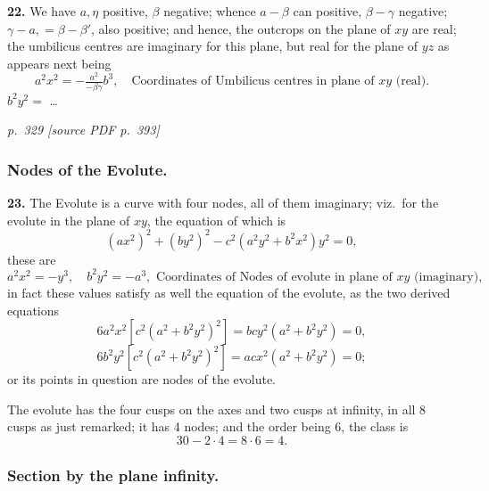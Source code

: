 \documentclass[11pt,a4paper]{article}
\newcommand{\pagemarker}[2]{\par\bigskip\noindent\textit{p.~#1 [source PDF p.~#2]}\par\smallskip}
\begin{document}
\textbf{22.} We have $a, \eta$ positive, $\beta$ negative; whence $a - \beta$ can positive, $\beta - \gamma$ negative; $\gamma - a, = \beta - \beta'$, also positive; and hence, the outcrops on the plane of $xy$ are real; the umbilicus centres are imaginary for this plane, but real for the plane of $yz$ as appears next being
\[
a^2 x^2 = -\tfrac{a^2}{-\beta\gamma}b^3,\quad\text{Coordinates of Umbilicus centres in plane of $xy$ (real).}
\]
$b^2 y^2 = $ \ldots

\clearpage

\pagemarker{329}{393}

\subsubsection*{Nodes of the Evolute.}

\textbf{23.} The Evolute is a curve with four nodes, all of them imaginary; viz.\ for the evolute in the plane of $xy$, the equation of which is
\[
(a x^2)^2 + (b y^2)^2 - c^2(a^2 y^2 + b^2 x^2) y^2 = 0,
\]
these are
\[
a^2 x^2 = -y^3,\quad b^2 y^2 = -a^3,\text{ Coordinates of Nodes of evolute in plane of $xy$ (imaginary)},
\]
in fact these values satisfy as well the equation of the evolute, as the two derived equations
\[
6a^2 x^2 [c^2(a^2 + b^2 y^2)^2] = b c y^2(a^2 + b^2 y^2) = 0,
\]
\[
6b^2 y^2 [c^2(a^2 + b^2 y^2)^2] = a c x^2(a^2 + b^2 y^2) = 0;
\]
or its points in question are nodes of the evolute.

The evolute has the four cusps on the axes and two cusps at infinity, in all 8 cusps as just remarked; it has 4 nodes; and the order being 6, the class is
\[
30 - 2 \cdot 4 = 8 \cdot 6 = 4.
\]

\subsubsection*{Section by the plane infinity.}
\end{document}
